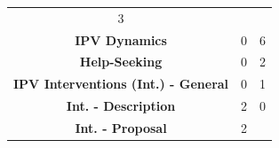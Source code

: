 \documentclass[]{tufte-handout}
\begin{document}
\begin{longtable}[]{@{}cll@{}}
\begin{minipage}[t]{0.22\columnwidth}
3\strut
\end{minipage}\tabularnewline
\begin{minipage}[t]{0.47\columnwidth}\centering\strut
\textbf{IPV Dynamics}\strut
\end{minipage} & \begin{minipage}[t]{0.22\columnwidth}\raggedright\strut
0\strut
\end{minipage} & \begin{minipage}[t]{0.22\columnwidth}\raggedright\strut
6\strut
\end{minipage}\tabularnewline
\begin{minipage}[t]{0.47\columnwidth}\centering\strut
\textbf{Help-Seeking}\strut
\end{minipage} & \begin{minipage}[t]{0.22\columnwidth}\raggedright\strut
0\strut
\end{minipage} & \begin{minipage}[t]{0.22\columnwidth}\raggedright\strut
2\strut
\end{minipage}\tabularnewline
\begin{minipage}[t]{0.47\columnwidth}\centering\strut
\textbf{IPV Interventions (Int.) - General}\strut
\end{minipage} & \begin{minipage}[t]{0.22\columnwidth}\raggedright\strut
0\strut
\end{minipage} & \begin{minipage}[t]{0.22\columnwidth}\raggedright\strut
1\strut
\end{minipage}\tabularnewline
\begin{minipage}[t]{0.47\columnwidth}\centering\strut
\textbf{Int. - Description}\strut
\end{minipage} & \begin{minipage}[t]{0.22\columnwidth}\raggedright\strut
2\strut
\end{minipage} & \begin{minipage}[t]{0.22\columnwidth}\raggedright\strut
0\strut
\end{minipage}\tabularnewline
\begin{minipage}[t]{0.47\columnwidth}\centering\strut
\textbf{Int. - Proposal}\strut
\end{minipage} & \begin{minipage}[t]{0.22\columnwidth}\raggedright\strut
2\strut
\end{minipage} & \begin{minipage}[t]{0.22\columnwidth}\raggedright\strut

\end{minipage}
\end{longtable}
\end{document}
